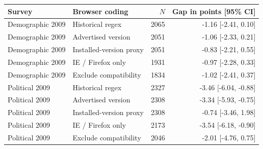 \begin{tabular}{llrr}
\toprule
Survey & Browser coding & $N$ & Gap in points [95\% CI] \\
\midrule
Demographic 2009 & Historical regex & 2065 & -1.16 [-2.41, 0.10] \\
Demographic 2009 & Advertised version & 2051 & -1.06 [-2.33, 0.21] \\
Demographic 2009 & Installed-version proxy & 2051 & -0.83 [-2.21, 0.55] \\
Demographic 2009 & IE / Firefox only & 1931 & -0.97 [-2.28, 0.33] \\
Demographic 2009 & Exclude compatibility & 1834 & -1.02 [-2.41, 0.37] \\
Political 2009 & Historical regex & 2327 & -3.46 [-6.04, -0.88] \\
Political 2009 & Advertised version & 2308 & -3.34 [-5.93, -0.75] \\
Political 2009 & Installed-version proxy & 2308 & -0.74 [-3.46, 1.98] \\
Political 2009 & IE / Firefox only & 2173 & -3.54 [-6.18, -0.90] \\
Political 2009 & Exclude compatibility & 2046 & -2.01 [-4.76, 0.75] \\
\bottomrule
\end{tabular}
